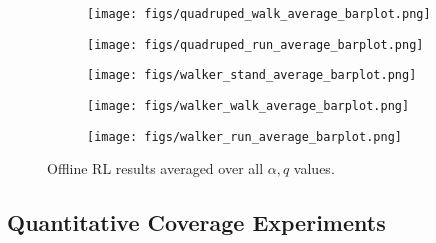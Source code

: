 \begin{figure}
    \begin{subfigure}{0.49\textwidth}
        \texttt{[image: figs/quadruped\_walk\_average\_barplot.png]}
        \label{fig:orl_appendix:quad_walk_average}
    \end{subfigure}
    \hfill
    \begin{subfigure}{0.49\textwidth}
        \texttt{[image: figs/quadruped\_run\_average\_barplot.png]}
        \label{fig:orl_appendix:quad_run_average}
    \end{subfigure}
    
    \medskip
    \begin{subfigure}{0.49\textwidth}
        \texttt{[image: figs/walker\_stand\_average\_barplot.png]}
        \label{fig:orl_appendix:walker_stand_average}
    \end{subfigure}
    \hfill
    \begin{subfigure}{0.49\textwidth}
        \texttt{[image: figs/walker\_walk\_average\_barplot.png]}
        \label{fig:orl_appendix:walker_walk_average}
    \end{subfigure}
    
    \medskip
    \centering
    \begin{subfigure}{0.49\textwidth}
        \texttt{[image: figs/walker\_run\_average\_barplot.png]}
    \end{subfigure}
    \caption{Offline RL results averaged over all $\alpha, q$ values.}
    \label{fig:orl_average_appendix}
\end{figure}










\newpage
\subsection{Quantitative Coverage Experiments}

